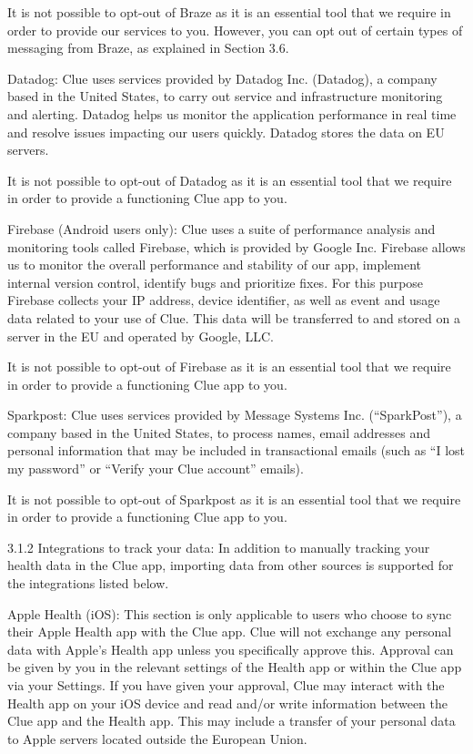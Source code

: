 It is not possible to opt-out of Braze as it is an essential tool that we require in order to provide our services to you. However, you can opt out of certain types of messaging from Braze, as explained in Section 3.6.

Datadog: Clue uses services provided by Datadog Inc. (Datadog), a company based in the United States, to carry out service and infrastructure monitoring and alerting. Datadog helps us monitor the application performance in real time and resolve issues impacting our users quickly. Datadog stores the data on EU servers.

It is not possible to opt-out of Datadog as it is an essential tool that we require in order to provide a functioning Clue app to you.

Firebase (Android users only): Clue uses a suite of performance analysis and monitoring tools called Firebase, which is provided by Google Inc. Firebase allows us to monitor the overall performance and stability of our app, implement internal version control, identify bugs and prioritize fixes. For this purpose Firebase collects your IP address, device identifier, as well as event and usage data related to your use of Clue. This data will be transferred to and stored on a server in the EU and operated by Google, LLC.

It is not possible to opt-out of Firebase as it is an essential tool that we require in order to provide a functioning Clue app to you.

Sparkpost: Clue uses services provided by Message Systems Inc. (“SparkPost”), a company based in the United States, to process names, email addresses and personal information that may be included in transactional emails (such as “I lost my password” or “Verify your Clue account” emails).

It is not possible to opt-out of Sparkpost as it is an essential tool that we require in order to provide a functioning Clue app to you.

3.1.2 Integrations to track your data:
In addition to manually tracking your health data in the Clue app, importing data from other sources is supported for the integrations listed below.

Apple Health (iOS): This section is only applicable to users who choose to sync their Apple Health app with the Clue app. Clue will not exchange any personal data with Apple’s Health app unless you specifically approve this. Approval can be given by you in the relevant settings of the Health app or within the Clue app via your Settings. If you have given your approval, Clue may interact with the Health app on your iOS device and read and/or write information between the Clue app and the Health app. This may include a transfer of your personal data to Apple servers located outside the European Union.

